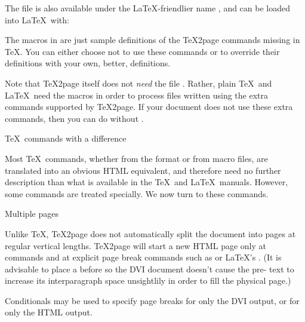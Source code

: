\p{

}

\n The file is also available
under the \LaTeX-friendlier name , and can be
loaded into \LaTeX\ with:

\p{
\usepackage{tex2page} %
}

The macros in  are just sample
definitions of the \TeX2page commands missing in \TeX.
You can either  choose not to use these commands or to
override their definitions with your own, better,
definitions.


Note that \TeX2page itself does not {\em need} the file
.  Rather, plain \TeX\ and \LaTeX\ need the
 macros in order to process files
written using the extra commands supported by \TeX2page.
If your document does not use these extra
commands, then you can do without .

 \TeX\ commands with a difference

Most \TeX\ commands, whether from the format or from
macro files, are translated into an obvious HTML
equivalent, and therefore need no further description
than what is available in the \TeX\ and \LaTeX\ manuals.
However, some commands are treated
specially.  We now turn to these commands.

\beginsection  Multiple pages

%
Unlike \TeX, \TeX2page does not automatically split the document into
pages at regular vertical lengths.
\TeX2page will start a new HTML page only at \p{\chapter}
commands and at explicit page break commands such as
\p{\eject} or \LaTeX's \p{\clearpage}.
(It is advisable to place a \p{\vfill} before
\p{\eject} so the DVI document doesn't cause the
pre-\p{\eject} text  to increase its
interparagraph space unsightlily in order to fill
the physical page.)

Conditionals may be used to specify page breaks for
only the DVI output, or for only the HTML output.

